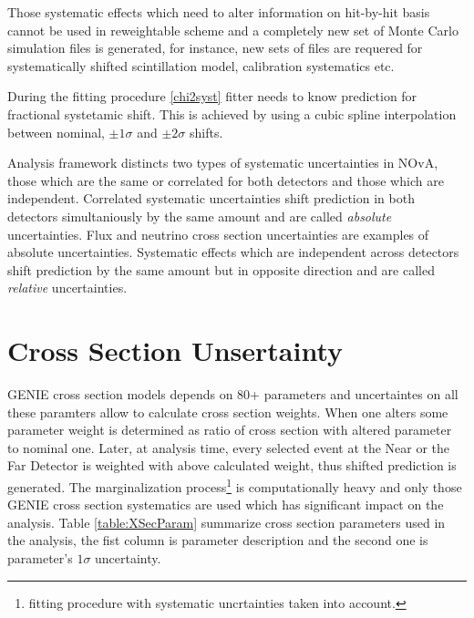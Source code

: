 Those systematic effects which need to alter information on hit-by-hit basis cannot be used in reweightable scheme 
and a completely new set of Monte Carlo simulation files is generated, for instance, new sets of files are requered for 
systematically shifted scintillation model, calibration systematics etc. 

During the fitting procedure \ref{chi2syst} fitter needs to know prediction for fractional systetamic shift. This is 
achieved by using a cubic spline interpolation between nominal, $\pm 1\sigma$ and $\pm 2\sigma$ shifts. 

Analysis framework distincts two types of systematic uncertainties in NOvA, those which are the same or correlated for 
both detectors and those which are independent. Correlated systematic uncertainties shift prediction in both detectors
simultaniously by the same amount and are called \textit{absolute} uncertainties. Flux and neutrino cross section 
uncertainties are examples of absolute uncertainties. Systematic effects which are independent across detectors 
shift prediction by the same amount but in opposite direction and are called \textit{relative} uncertainties.  

\section{Cross Section Unsertainty}
GENIE cross section models depends on 80+ parameters and uncertaintes on all these paramters allow to calculate cross
section weights. When one alters some parameter weight is determined as ratio of cross section with altered parameter
to nominal one. Later, at analysis time, every selected event at the Near or the Far Detector is weighted with above
calculated weight, thus shifted prediction is generated. The marginalization process\footnote{fitting procedure with 
systematic uncrtainties taken into account.} is computationally heavy and only those GENIE cross section systematics are 
used which has significant impact on the analysis. Table \ref{table:XSecParam} summarize cross section parameters used in
the analysis, the fist column is parameter description and the second one is parameter's $1\sigma$ uncertainty. 

